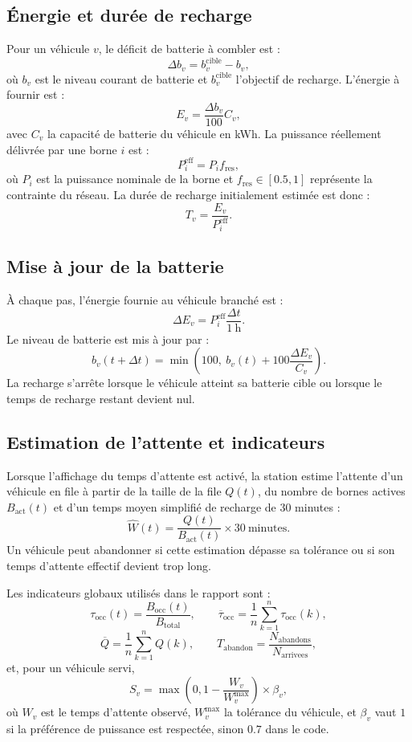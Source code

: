 \documentclass[11pt]{article}
\begin{document}
\subsection{Énergie et durée de recharge}

Pour un véhicule $v$, le déficit de batterie à combler est :
\[
\Delta b_v = b_v^{\mathrm{cible}} - b_v,
\]
où $b_v$ est le niveau courant de batterie et $b_v^{\mathrm{cible}}$ l'objectif de recharge. L'énergie à fournir est :
\[
E_v = \frac{\Delta b_v}{100} C_v,
\]
avec $C_v$ la capacité de batterie du véhicule en kWh. La puissance réellement délivrée par une borne $i$ est :
\[
P_i^{\mathrm{eff}} = P_i f_{\mathrm{res}},
\]
où $P_i$ est la puissance nominale de la borne et $f_{\mathrm{res}}\in[0.5,1]$ représente la contrainte du réseau. La durée de recharge initialement estimée est donc :
\[
T_v = \frac{E_v}{P_i^{\mathrm{eff}}}.
\]

\subsection{Mise à jour de la batterie}

À chaque pas, l'énergie fournie au véhicule branché est :
\[
\Delta E_v = P_i^{\mathrm{eff}}\frac{\Delta t}{1\ \mathrm{h}}.
\]
Le niveau de batterie est mis à jour par :
\[
b_v(t+\Delta t)=\min\left(100,\ b_v(t)+100\frac{\Delta E_v}{C_v}\right).
\]
La recharge s'arrête lorsque le véhicule atteint sa batterie cible ou lorsque le temps de recharge restant devient nul.

\subsection{Estimation de l'attente et indicateurs}

Lorsque l'affichage du temps d'attente est activé, la station estime l'attente d'un véhicule en file à partir de la taille de la file $Q(t)$, du nombre de bornes actives $B_{\mathrm{act}}(t)$ et d'un temps moyen simplifié de recharge de 30 minutes :
\[
\widehat{W}(t)=\frac{Q(t)}{B_{\mathrm{act}}(t)}\times 30\ \mathrm{minutes}.
\]
Un véhicule peut abandonner si cette estimation dépasse sa tolérance ou si son temps d'attente effectif devient trop long.

Les indicateurs globaux utilisés dans le rapport sont :
\[
\tau_{\mathrm{occ}}(t)=\frac{B_{\mathrm{occ}}(t)}{B_{\mathrm{total}}},
\qquad
\overline{\tau}_{\mathrm{occ}}=\frac{1}{n}\sum_{k=1}^{n}\tau_{\mathrm{occ}}(k),
\]
\[
\overline{Q}=\frac{1}{n}\sum_{k=1}^{n}Q(k),
\qquad
T_{\mathrm{abandon}}=\frac{N_{\mathrm{abandons}}}{N_{\mathrm{arrivees}}},
\]
et, pour un véhicule servi,
\[
S_v=\max\left(0,1-\frac{W_v}{W_v^{\max}}\right)\times \beta_v,
\]
où $W_v$ est le temps d'attente observé, $W_v^{\max}$ la tolérance du véhicule, et $\beta_v$ vaut $1$ si la préférence de puissance est respectée, sinon $0.7$ dans le code.
\newpage
\end{document}
